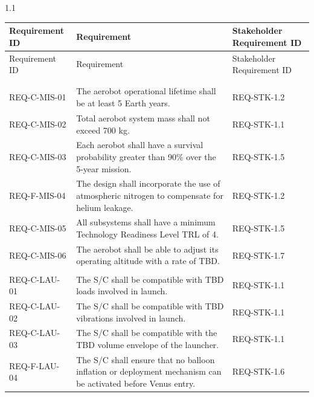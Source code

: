 {{\begin{spacing}{1.1}
\begin{longtable}{@{}
>{\raggedright\arraybackslash}p{}
>{\raggedright\arraybackslash}p{}
>{\raggedright\arraybackslash}p{}
@{}}
\toprule
Requirement ID & Requirement & Stakeholder Requirement ID \\
\midrule
\endfirsthead

\toprule
Requirement ID & Requirement & Stakeholder Requirement ID \\
\midrule
\endhead

\midrule
\multicolumn{3}{r}{\small Continued on next page} \\
\endfoot

\bottomrule
\endlastfoot

\multicolumn{3}{@{}l}{\textbf{Complete S/C}} \\
\midrule

REQ-C-MIS-01 &
The aerobot operational lifetime shall be at least 5 Earth years. &
REQ-STK-1.2 \\

REQ-C-MIS-02 &
Total aerobot system mass shall not exceed 700 kg. &
REQ-STK-1.1 \\

REQ-C-MIS-03 &
Each aerobot shall have a survival probability greater than 90\% over the 5-year mission. &
REQ-STK-1.5 \\

REQ-F-MIS-04 &
The design shall incorporate the use of atmospheric nitrogen to compensate for helium leakage. &
REQ-STK-1.2 \\

REQ-C-MIS-05 &
All subsystems shall have a minimum Technology Readiness Level TRL of 4. &
REQ-STK-1.5 \\
REQ-C-MIS-06 & The aerobot shall be able to adjust its operating altitude with a rate of TBD.& REQ-STK-1.7 \\
\multicolumn{3}{@{}l}{\textbf{Launch}} \\
\midrule

REQ-C-LAU-01 &
The S/C shall be compatible with TBD loads involved in launch. &
REQ-STK-1.1 \\

REQ-C-LAU-02 &
The S/C shall be compatible with TBD vibrations involved in launch. &
REQ-STK-1.1\\

REQ-C-LAU-03 &
The S/C shall be compatible with the TBD volume envelope of the launcher. &
REQ-STK-1.1 \\

REQ-F-LAU-04 &
The S/C shall ensure that no balloon inflation or deployment mechanism can be activated before Venus entry. &
REQ-STK-1.6 \\


\end{longtable}
\end{spacing}}}

